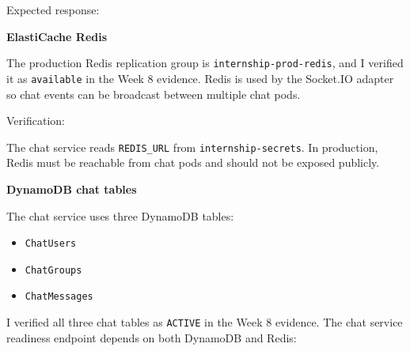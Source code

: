 Expected response:

\begin{Shaded}
\begin{Highlighting}[]
\FunctionTok{\{}\FunctionTok{:}\FunctionTok{,}\FunctionTok{:}\FunctionTok{,}\FunctionTok{:\{}\FunctionTok{:}\FunctionTok{\}\}}
\end{Highlighting}
\end{Shaded}

\vspace{0.5em}\noindent\textbf{ElastiCache Redis}\par

The production Redis replication group is
\texttt{internship-\allowbreak{}prod-\allowbreak{}redis}, and I verified it as \texttt{available}
in the Week 8 evidence. Redis is used by the Socket.IO adapter so chat
events can be broadcast between multiple chat pods.

Verification:

\begin{Shaded}
\begin{Highlighting}[]
\DataTypeTok{\textbackslash{}}
  \DataTypeTok{\textbackslash{}}
\end{Highlighting}
\end{Shaded}

The chat service reads \texttt{REDIS\_\allowbreak{}URL} from
\texttt{internship-\allowbreak{}secrets}. In production, Redis must be reachable from
chat pods and should not be exposed publicly.

\vspace{0.5em}\noindent\textbf{DynamoDB chat tables}\par

The chat service uses three DynamoDB tables:

\begin{itemize}
\tightlist
\item
  \texttt{ChatUsers}
\item
  \texttt{ChatGroups}
\item
  \texttt{ChatMessages}
\end{itemize}

I verified all three chat tables as \texttt{ACTIVE} in the Week 8
evidence. The chat service readiness endpoint depends on both DynamoDB
and Redis:

